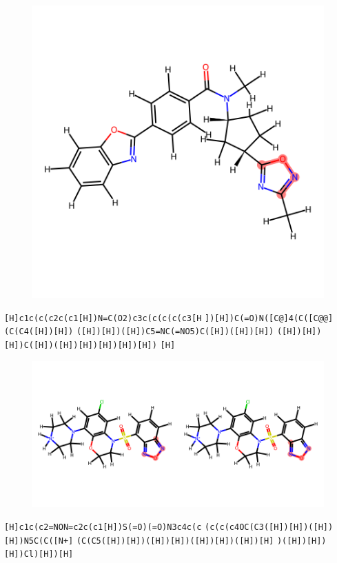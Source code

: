 \documentclass{article}
\begin{document}
\begin{figure}[ht]
\centering
    \includegraphics{mol132.png}
\end{figure}
\verb|[H]c1c(c(c2c(c1[H])N=C(O2)c3c(c(c(c(c3[H| \verb|])[H])C(=O)N([C@]4(C([C@@](C(C4([H])[H])| \verb|([H])[H])([H])C5=NC(=NO5)C([H])([H])[H])| \verb|([H])[H])[H])C([H])([H])[H])[H])[H])[H])| \verb|[H]|

\begin{figure}[ht]
\centering
    \includegraphics{mol133.png}
\end{figure}
\verb|[H]c1c(c2=NON=c2c(c1[H])S(=O)(=O)N3c4c(c| \verb|(c(c(c4OC(C3([H])[H])([H])[H])N5C(C([N+]| \verb|(C(C5([H])[H])([H])[H])([H])[H])([H])[H]| \verb|)([H])[H])[H])Cl)[H])[H]|
\end{document}
